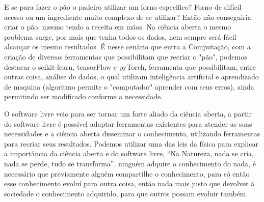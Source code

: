 \documentclass[12pt]{article}
\begin{document}
E se para fazer o pão o padeiro utilizar um forno especifico? Forno de difícil acesso ou um ingrediente muito complexo de se utilizar? Então não conseguiria criar o pão, mesmo tendo a receita em mãos. Na ciência aberta o mesmo problema surge, por mais que tenha todos os dados, nem sempre será fácil alcançar os mesmo resultados. É nesse cenário que entra a Computação, com a criação de diversas ferramentas que possibilitam que recriar o "pão", podemos destacar o scikit-learn, tensorFlow e pyTorch, ferramenta que possibilitam, entre outras coisa, análise de dados, o qual utilizam inteligência artificial e aprendizado de maquina (algoritmo permite o "computador" aprender com seus erros), ainda permitindo ser modificado conforme a necessidade. 

O software livre veio para ser tornar um forte aliado da ciência aberta, a partir do software livre é possível adaptar ferramentas existentes para atender as suas necessidades e a ciência aberta disseminar o conhecimento, utilizando ferramentas para recriar seus resultados. 
Podemos utilizar uma das leis da física para explicar a importância da ciência aberta e do software livre, “Na Natureza, nada se cria, nada se perde, tudo se transforma”, ninguém adquire o conhecimento do nada, é necessário que previamente alguém compartilhe o conhecimento, para só então esse conhecimento evoluí para outra coisa, então nada mais justo que devolver à sociedade o conhecimento adquirido, para que outros possam evoluir também.



\end{document}
